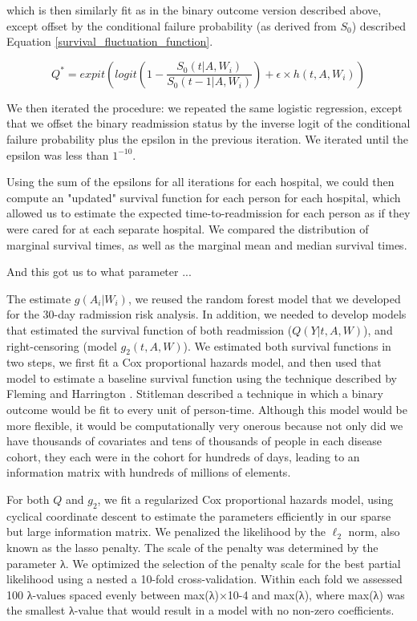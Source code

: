 \documentclass[]{article}\usepackage[]{graphicx}\usepackage[]{color}
\begin{document}
which is then similarly fit as in the binary outcome version described above, except offset by the conditional failure probability (as derived from $S_0$) described Equation \ref{survival_fluctuation_function}.

\begin{equation}
\label{survival_fluctuation_function} 
Q^*=expit(logit(1-\frac{S_0(t|A,W_i)}{S_0(t-1|A,W_i)}) + \epsilon \times h(t,A,W_i))
\end{equation}

We then iterated the procedure: we repeated the same logistic regression, except that we offset the binary readmission status by the inverse logit of the conditional failure probability plus the epsilon in the previous iteration. We iterated until the epsilon was less than $1^{-10}$.

Using the sum of the epsilons for all iterations for each hospital, we could then compute an "updated" survival function for each person for each hospital, which allowed us to estimate the expected time-to-readmission for each person as if they were cared for at each separate hospital. We compared the distribution of marginal survival times, as well as the marginal mean and median survival times.

And this got us to what parameter ...

The estimate $g(A_i|W_i)$, we reused the random forest model that we developed for the 30-day radmission risk analysis. In addition, we needed to develop models that estimated the survival function of both readmission ($Q(Y|t,A,W)$), and right-censoring (model $g_2(t,A,W)$). We estimated both survival functions in two steps, we first fit a Cox proportional hazards model, and then used that model to estimate a baseline survival function using the technique described by Fleming and Harrington \supercite{fleming_nonparametric_1984}. Stitleman described a technique in which a binary outcome would be fit to every unit of person-time. Although this model would be more flexible, it would be computationally very onerous because not only did we have thousands of covariates and tens of thousands of people in each disease cohort, they each were in the cohort for hundreds of days, leading to an information matrix with hundreds of millions of elements.

For both $Q$ and $g_2$, we fit a regularized Cox proportional hazards model, using cyclical coordinate descent to estimate the parameters efficiently in our sparse but large information matrix. We penalized the likelihood by the $\ell_2$ norm, also known as the lasso penalty. The scale of the penalty was determined by the parameter λ. We optimized the selection of the penalty scale for the best partial likelihood using a nested a 10-fold cross-validation. Within each fold we assessed 100 λ-values spaced evenly between max(λ)×10-4 and max(λ), where max(λ) was the smallest λ-value that would result in a model with no non-zero coefficients.
\end{document}

